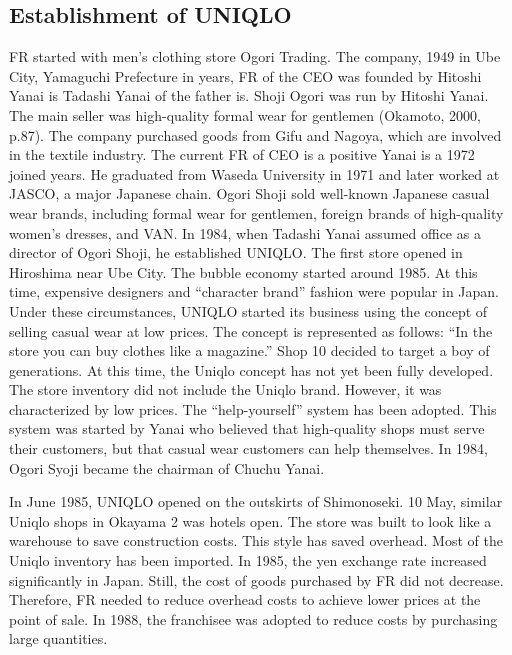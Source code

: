 \documentclass[12pt,]{article}
\begin{document}
\hypertarget{establishment-of-uniqlo}{%
\subsection{Establishment of UNIQLO}\label{establishment-of-uniqlo}}

FR started with men's clothing store Ogori Trading. The company, 1949 in
Ube City, Yamaguchi Prefecture in years, FR of the CEO was founded by
Hitoshi Yanai is Tadashi Yanai of the father is. Shoji Ogori was run by
Hitoshi Yanai. The main seller was high-quality formal wear for
gentlemen (Okamoto, 2000, p.87). The company purchased goods from Gifu
and Nagoya, which are involved in the textile industry. The current FR
of CEO is a positive Yanai is a 1972 joined years. He graduated from
Waseda University in 1971 and later worked at JASCO, a major Japanese
chain. Ogori Shoji sold well-known Japanese casual wear brands,
including formal wear for gentlemen, foreign brands of high-quality
women's dresses, and VAN. In 1984, when Tadashi Yanai assumed office as
a director of Ogori Shoji, he established UNIQLO. The first store opened
in Hiroshima near Ube City. The bubble economy started around 1985. At
this time, expensive designers and ``character brand'' fashion were
popular in Japan. Under these circumstances, UNIQLO started its business
using the concept of selling casual wear at low prices. The concept is
represented as follows: ``In the store you can buy clothes like a
magazine.'' Shop 10 decided to target a boy of generations. At this
time, the Uniqlo concept has not yet been fully developed. The store
inventory did not include the Uniqlo brand. However, it was
characterized by low prices. The ``help-yourself'' system has been
adopted. This system was started by Yanai who believed that high-quality
shops must serve their customers, but that casual wear customers can
help themselves. In 1984, Ogori Syoji became the chairman of Chuchu
Yanai.

In June 1985, UNIQLO opened on the outskirts of Shimonoseki. 10 May,
similar Uniqlo shops in Okayama 2 was hotels open. The store was built
to look like a warehouse to save construction costs. This style has
saved overhead. Most of the Uniqlo inventory has been imported. In 1985,
the yen exchange rate increased significantly in Japan. Still, the cost
of goods purchased by FR did not decrease. Therefore, FR needed to
reduce overhead costs to achieve lower prices at the point of sale. In
1988, the franchisee was adopted to reduce costs by purchasing large
quantities.
\end{document}
